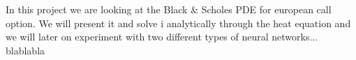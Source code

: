 In this project we are looking at the Black & Scholes PDE for european call option. We will present it and solve i analytically through the heat equation and we will later on experiment with two different types of neural networks... blablabla

